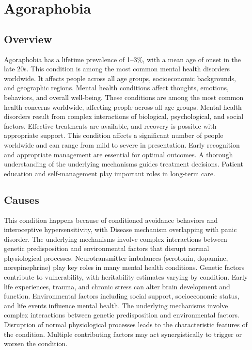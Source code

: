 \chapter{Agoraphobia}
\label{sec:Agoraphobia}

\section{Overview}
Agoraphobia has a lifetime prevalence of 1--3\%, with a mean age of onset in the late 20s. This condition is among the most common mental health disorders worldwide. It affects people across all age groups, socioeconomic backgrounds, and geographic regions. Mental health conditions affect thoughts, emotions, behaviors, and overall well-being. These conditions are among the most common health concerns worldwide, affecting people across all age groups. Mental health disorders result from complex interactions of biological, psychological, and social factors. Effective treatments are available, and recovery is possible with appropriate support. This condition affects a significant number of people worldwide and can range from mild to severe in presentation. Early recognition and appropriate management are essential for optimal outcomes. A thorough understanding of the underlying mechanisms guides treatment decisions. Patient education and self-management play important roles in long-term care.
\section{Causes}
This condition happens because of conditioned avoidance behaviors and interoceptive hypersensitivity, with Disease mechanism overlapping with panic disorder. The underlying mechanisms involve complex interactions between genetic predisposition and environmental factors that disrupt normal physiological processes. Neurotransmitter imbalances (serotonin, dopamine, norepinephrine) play key roles in many mental health conditions. Genetic factors contribute to vulnerability, with heritability estimates varying by condition. Early life experiences, trauma, and chronic stress can alter brain development and function. Environmental factors including social support, socioeconomic status, and life events influence mental health. The underlying mechanisms involve complex interactions between genetic predisposition and environmental factors. Disruption of normal physiological processes leads to the characteristic features of the condition. Multiple contributing factors may act synergistically to trigger or worsen the condition.
